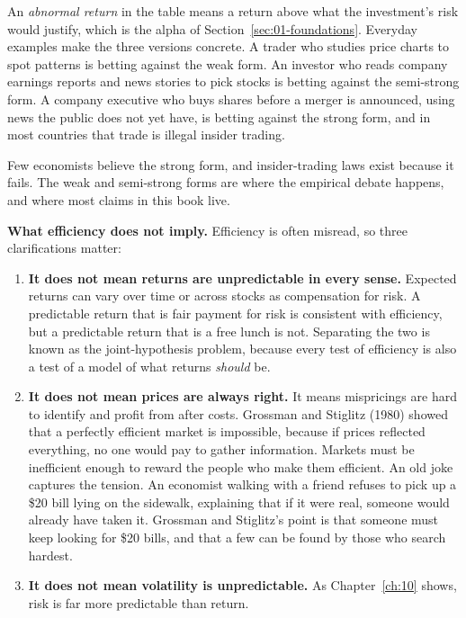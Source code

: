 An \emph{abnormal return} in the table means a return above what the investment's risk would justify, which is the alpha of Section~\ref{sec:01-foundations}. Everyday examples make the three versions concrete. A trader who studies price charts to spot patterns is betting against the weak form. An investor who reads company earnings reports and news stories to pick stocks is betting against the semi-strong form. A company executive who buys shares before a merger is announced, using news the public does not yet have, is betting against the strong form, and in most countries that trade is illegal insider trading.

Few economists believe the strong form, and insider-trading laws exist because it fails. The weak and semi-strong forms are where the empirical debate happens, and where most claims in this book live.

\textbf{What efficiency does not imply.} Efficiency is often misread, so three clarifications matter:

\begin{enumerate}
  \item \textbf{It does not mean returns are unpredictable in every sense.} Expected returns can vary over time or across stocks as compensation for risk. A predictable return that is fair payment for risk is consistent with efficiency, but a predictable return that is a free lunch is not. Separating the two is known as the joint-hypothesis problem, because every test of efficiency is also a test of a model of what returns \emph{should} be.
  \item \textbf{It does not mean prices are always right.} It means mispricings are hard to identify and profit from after costs. Grossman and Stiglitz (1980) showed that a perfectly efficient market is impossible, because if prices reflected everything, no one would pay to gather information. Markets must be inefficient enough to reward the people who make them efficient. An old joke captures the tension. An economist walking with a friend refuses to pick up a \$20 bill lying on the sidewalk, explaining that if it were real, someone would already have taken it. Grossman and Stiglitz's point is that someone must keep looking for \$20 bills, and that a few can be found by those who search hardest.
  \item \textbf{It does not mean volatility is unpredictable.} As Chapter~\ref{ch:10} shows, risk is far more predictable than return.
\end{enumerate}

